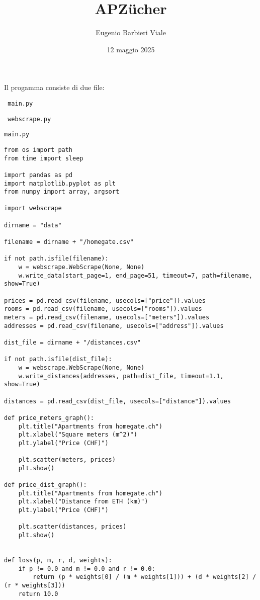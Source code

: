 \documentclass[12pt]{article}
\title{APZücher}
\author{Eugenio Barbieri Viale}
\date{12 maggio 2025}
\begin{document}
\setlength{\parindent}{0pt}

\maketitle
Il progamma consiste di due file:
\begin{verbatim} main.py \end{verbatim} 
\begin{verbatim} webscrape.py \end{verbatim}

\newpage
\begin{verbatim}
main.py
\end{verbatim}

\lstset{language=Python}
\begin{lstlisting}
from os import path
from time import sleep

import pandas as pd
import matplotlib.pyplot as plt
from numpy import array, argsort

import webscrape

dirname = "data"

filename = dirname + "/homegate.csv"

if not path.isfile(filename):
    w = webscrape.WebScrape(None, None)
    w.write_data(start_page=1, end_page=51, timeout=7, path=filename, show=True)

prices = pd.read_csv(filename, usecols=["price"]).values
rooms = pd.read_csv(filename, usecols=["rooms"]).values
meters = pd.read_csv(filename, usecols=["meters"]).values
addresses = pd.read_csv(filename, usecols=["address"]).values

dist_file = dirname + "/distances.csv"

if not path.isfile(dist_file):
    w = webscrape.WebScrape(None, None)
    w.write_distances(addresses, path=dist_file, timeout=1.1, show=True)

distances = pd.read_csv(dist_file, usecols=["distance"]).values

def price_meters_graph():
    plt.title("Apartments from homegate.ch")
    plt.xlabel("Square meters (m^2)")
    plt.ylabel("Price (CHF)")

    plt.scatter(meters, prices)
    plt.show()

def price_dist_graph():
    plt.title("Apartments from homegate.ch")
    plt.xlabel("Distance from ETH (km)")
    plt.ylabel("Price (CHF)")

    plt.scatter(distances, prices)
    plt.show()


def loss(p, m, r, d, weights):
    if p != 0.0 and m != 0.0 and r != 0.0:
        return (p * weights[0] / (m * weights[1])) + (d * weights[2] /  (r * weights[3]))
    return 10.0


\end{lstlisting}
\end{document}
